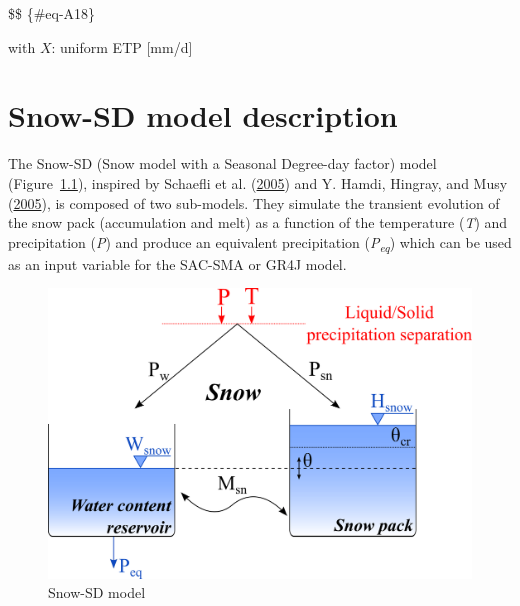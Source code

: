 \documentclass[
  letterpaper,
  DIV=11,
  numbers=noendperiod]{scrreprt}
\begin{document}
\$\$ \{\#eq-A18\}

with \(X\): uniform ETP {[}mm/d{]}

\hypertarget{sec-model_snow}{%
\chapter{Snow-SD model description}\label{sec-model_snow}}

The Snow-SD (Snow model with a Seasonal Degree-day factor) model
(Figure~\ref{fig-model_snow}), inspired by Schaefli et al.
(\protect\hyperlink{ref-schaefli_conceptual_2005}{2005}) and Y. Hamdi,
Hingray, and Musy
(\protect\hyperlink{ref-hamdi_modeprevision_2005}{2005}), is composed of
two sub-models. They simulate the transient evolution of the snow pack
(accumulation and melt) as a function of the temperature (\emph{T}) and
precipitation (\emph{P}) and produce an equivalent precipitation
(\emph{P\textsubscript{eq}}) which can be used as an input variable for
the SAC-SMA or GR4J model.

\begin{figure}

{\centering \includegraphics{./figures/fig-model_snow.png}

}

\caption{\label{fig-model_snow}Snow-SD model}

\end{figure}
\end{document}
